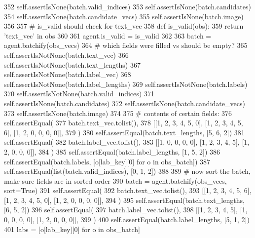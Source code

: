 \begin{DoxyCode}
352             self.assertIsNone(batch.valid\_indices)
353             self.assertIsNone(batch.candidates)
354             self.assertIsNone(batch.candidate\_vecs)
355             self.assertIsNone(batch.image)
356 
357             \textcolor{comment}{# is\_valid should check for text\_vec}
358             \textcolor{keyword}{def }is\_valid(obs):
359                 \textcolor{keywordflow}{return} \textcolor{stringliteral}{'text\_vec'} \textcolor{keywordflow}{in} obs
360 
361             agent.is\_valid = is\_valid
362 
363             batch = agent.batchify(obs\_vecs)
364             \textcolor{comment}{# which fields were filled vs should be empty?}
365             self.assertIsNotNone(batch.text\_vec)
366             self.assertIsNotNone(batch.text\_lengths)
367             self.assertIsNotNone(batch.label\_vec)
368             self.assertIsNotNone(batch.label\_lengths)
369             self.assertIsNotNone(batch.labels)
370             self.assertIsNotNone(batch.valid\_indices)
371             self.assertIsNone(batch.candidates)
372             self.assertIsNone(batch.candidate\_vecs)
373             self.assertIsNone(batch.image)
374 
375             \textcolor{comment}{# contents of certain fields:}
376             self.assertEqual(
377                 batch.text\_vec.tolist(),
378                 [[1, 2, 3, 4, 5, 0], [1, 2, 3, 4, 5, 6], [1, 2, 0, 0, 0, 0]],
379             )
380             self.assertEqual(batch.text\_lengths, [5, 6, 2])
381             self.assertEqual(
382                 batch.label\_vec.tolist(),
383                 [[1, 0, 0, 0, 0], [1, 2, 3, 4, 5], [1, 2, 0, 0, 0]],
384             )
385             self.assertEqual(batch.label\_lengths, [1, 5, 2])
386             self.assertEqual(batch.labels, [o[lab\_key][0] \textcolor{keywordflow}{for} o \textcolor{keywordflow}{in} obs\_batch])
387             self.assertEqual(list(batch.valid\_indices), [0, 1, 2])
388 
389             \textcolor{comment}{# now sort the batch, make sure fields are in sorted order}
390             batch = agent.batchify(obs\_vecs, sort=\textcolor{keyword}{True})
391             self.assertEqual(
392                 batch.text\_vec.tolist(),
393                 [[1, 2, 3, 4, 5, 6], [1, 2, 3, 4, 5, 0], [1, 2, 0, 0, 0, 0]],
394             )
395             self.assertEqual(batch.text\_lengths, [6, 5, 2])
396             self.assertEqual(
397                 batch.label\_vec.tolist(),
398                 [[1, 2, 3, 4, 5], [1, 0, 0, 0, 0], [1, 2, 0, 0, 0]],
399             )
400             self.assertEqual(batch.label\_lengths, [5, 1, 2])
401             labs = [o[lab\_key][0] \textcolor{keywordflow}{for} o \textcolor{keywordflow}{in} obs\_batch]

\end{DoxyCode}
